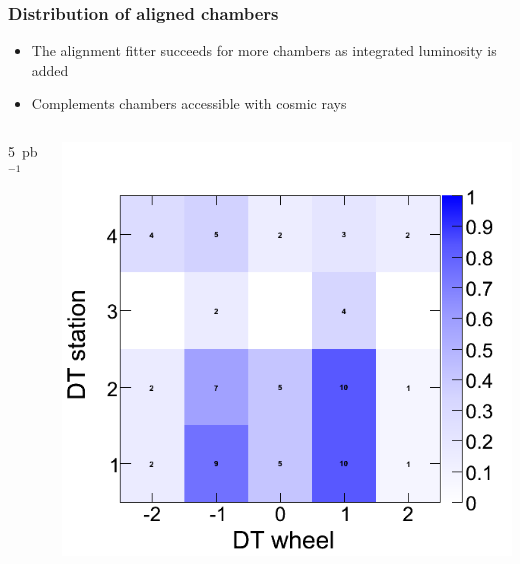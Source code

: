 \documentclass[compress]{beamer}
\begin{document}
\begin{frame}
\frametitle{Distribution of aligned chambers}

\begin{itemize}
\item The alignment fitter succeeds for more chambers as integrated luminosity is added

\item Complements chambers accessible with cosmic rays
\end{itemize}

\vspace{-0.6 cm}
\begin{columns}

\begin{center}
5~pb$^{-1}$
\end{center}

\vspace{-0.45 cm}
\includegraphics[width=\linewidth]{il05_DT_fraction.png}


\end{columns}
\end{frame}
\end{document}
